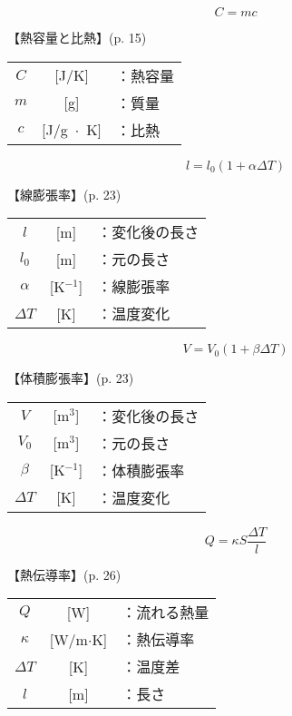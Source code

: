 \documentclass[10pt]{jarticle}
\begin{document}
\newpage





\newpage
\[
	C = m c
\]


\vskip3mm
【熱容量と比熱】{\footnotesize (p. 15)}

\begin{tabular}{ccl}
$C$	&[J/K]	&：熱容量\\
$m$	&[g]	&：質量\\
$c$	&[J/g $\!\! \cdot \!\! $ K]	&：比熱
\end{tabular}

\newpage




\newpage
\[
	l = l_0 (1+ \alpha \mathit{\Delta}T)
\]


\vskip3mm
【線膨張率】{\footnotesize (p. 23)}

\begin{tabular}{ccl}
$l$	&[m]	&：変化後の長さ\\
$l_0$	&[m]	&：元の長さ\\
$\alpha$	&[K$^{-1}$]	&：線膨張率\\
$\mathit{\Delta} T$	& [K]	&：温度変化
\end{tabular}



\newpage
\[
	V = V_0 (1+ \beta \mathit{\Delta}T)
\]


\vskip3mm
【体積膨張率】{\footnotesize (p. 23)}

\begin{tabular}{ccl}
$V$	&[m$^3$]	&：変化後の長さ\\
$V_0$	&[m$^3$]	&：元の長さ\\
$\beta$	&[K$^{-1}$]	&：体積膨張率\\
$\mathit{\Delta} T$	& [K]	&：温度変化
\end{tabular}




\newpage
\[
	Q = \kappa S \frac{\mathit{\Delta}T}{l}
\]


\vskip3mm
【熱伝導率】{\footnotesize (p. 26)}

\begin{tabular}{ccl}
$Q$	&[W]	&：流れる熱量\\
$\kappa$	&[W/m$\cdot$K]	&：熱伝導率\\
$\mathit{\Delta} T$	& [K]	&：温度差\\
$l$	&[m]	&：長さ
\end{tabular}
\end{document}
